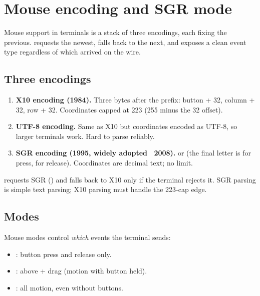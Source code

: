 \chapter{Mouse encoding and SGR mode}
\label{ch:mouse}

\begin{aside}
Mouse support in terminals is a stack of three encodings, each
fixing the previous. \maya{} requests the newest, falls back to
the next, and exposes a clean event type regardless of which
arrived on the wire.
\end{aside}

\section{Three encodings}

\begin{enumerate}[leftmargin=*]
  \item \textbf{X10 encoding (1984).} Three bytes after the
    \code{ESC [ M} prefix: button + 32, column + 32, row + 32.
    Coordinates capped at 223 (255 minus the 32 offset).
  \item \textbf{UTF-8 encoding.} Same as X10 but coordinates
    encoded as UTF-8, so larger terminals work. Hard to parse
    reliably.
  \item \textbf{SGR encoding (1995, widely adopted ~2008).}
    \code{ESC [ < button ; column ; row M} or  (the
    final letter is  for press,  for release).
    Coordinates are decimal text; no limit.
\end{enumerate}

\maya{} requests SGR (\code{ESC [ ? 1006 h}) and falls back to
X10 only if the terminal rejects it. SGR parsing is simple text
parsing; X10 parsing must handle the 223-cap edge.

\section{Modes}

Mouse modes control \emph{which} events the terminal sends:

\begin{itemize}[leftmargin=*]
  \item {}: button press and release only.
  \item {}: above + drag (motion with button held).
  \item {}: all motion, even without buttons.
\end{itemize}

